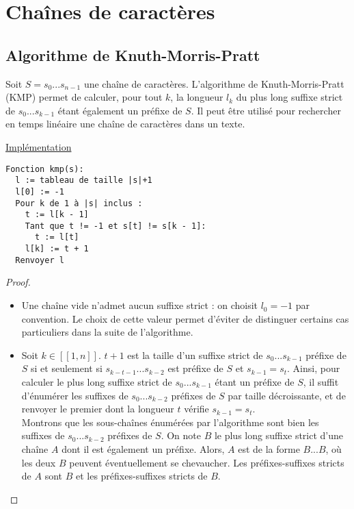 \documentclass[11pt,a4paper]{article}
\begin{document}
\section{Chaînes de caractères}


  \subsection{Algorithme de Knuth-Morris-Pratt}

Soit \(S = s_0...s_{n-1}\) une chaîne de caractères. L'algorithme de Knuth-Morris-Pratt (KMP) permet de calculer, pour tout \(k\), la longueur \(l_k\) du plus long suffixe strict de \(s_0...s_{k-1}\) étant également un préfixe de \(S\). Il peut être utilisé pour rechercher en temps linéaire une chaîne de caractères dans un texte.

\noindent\href{https://github.com/AdrienVannson/algo-lib/blob/master/include/strings/kmp.hpp}{Implémentation}
\begin{lstlisting}
Fonction kmp(s):
  l := tableau de taille |s|+1
  l[0] := -1
  Pour k de 1 à |s| inclus :
    t := l[k - 1]
    Tant que t != -1 et s[t] != s[k - 1]:
      t := l[t]
    l[k] := t + 1
  Renvoyer l
\end{lstlisting}

\begin{proof}\leavevmode
\begin{itemize}
  \item Une chaîne vide n'admet aucun suffixe strict : on choisit \(l_0 = -1\) par convention. Le choix de cette valeur permet d'éviter de distinguer certains cas particuliers dans la suite de l'algorithme.
  \item Soit \(k \in [\![1, n]\!]\). \(t+1\) est la taille d'un suffixe strict de \(s_0...s_{k-1}\) préfixe de \(S\) si et seulement si \(s_{k-t-1}...s_{k-2}\) est préfixe de \(S\) et \(s_{k-1}=s_t\). Ainsi, pour calculer le plus long suffixe strict de \(s_0...s_{k-1}\) étant un préfixe de \(S\), il suffit d'énumérer les suffixes de \(s_0...s_{k-2}\) préfixes de \(S\) par taille décroissante, et de renvoyer le premier dont la longueur \(t\) vérifie \(s_{k-1}=s_t\). \\
  Montrons que les sous-chaînes énumérées par l'algorithme sont bien les suffixes de \(s_0...s_{k-2}\) préfixes de \(S\). On note \(B\) le plus long suffixe strict d'une chaîne \(A\) dont il est également un préfixe. Alors, \(A\) est de la forme \(B ... B\), où les deux \(B\) peuvent éventuellement se chevaucher. Les préfixes-suffixes stricts de \(A\) sont \(B\) et les préfixes-suffixes stricts de \(B\).
\end{itemize}
\end{proof}
\end{document}
